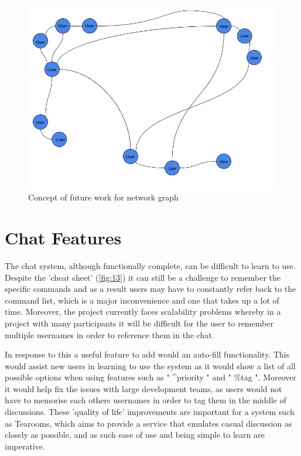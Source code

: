 \documentclass{l4proj}
\begin{document}
\begin{figure}[h]
\includegraphics[scale = 0.5]{Proposed-graph.png}
\centering
\caption{Concept of future work for network graph}
\label{fig:6}
\end{figure}

\newpage

\section{Chat Features}

The chat system, although functionally complete, can be difficult to learn to use.  Despite the 'cheat sheet' (\ref{fig:13}) it can still be a challenge to remember the specific commands and as a result users may have to constantly refer back to the command list, which is a major inconvenience and one that takes up a lot of time.  Moreover, the project currently faces scalability problems whereby in a project with many participants it will be difficult for the user to remember multiple usernames in order to reference them in the chat.  

In response to this a useful feature to add would an auto-fill functionality.  This would assist new users in learning to use the system as it would show a list of all possible options when using features such as " \textasciicircum priority " and " \%tag ".  Moreover it would help fix the issues with large development teams, as users would not have to memorise each others usernames in order to tag them in the middle of discussions.  These 'quality of life' improvements are important for a system such as Tearooms, which aims to provide a service that emulates casual discussion as closely as possible, and as such ease of use and being simple to learn are imperative. 
\end{document}
